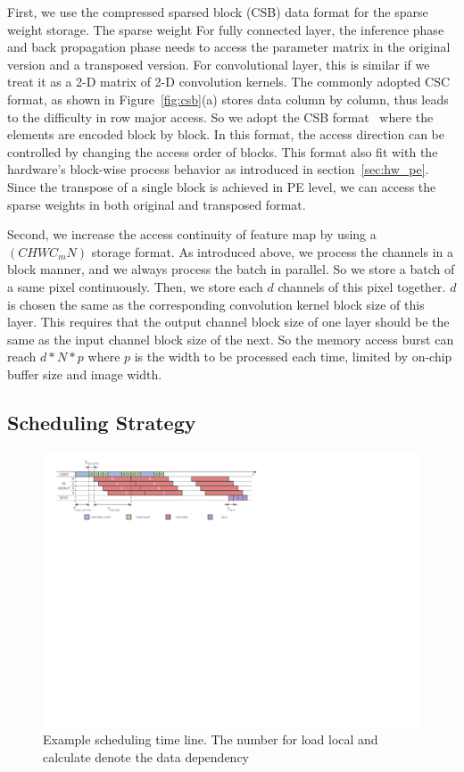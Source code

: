 First, we use the compressed sparsed block (CSB) data format for the sparse weight storage. The sparse weight For fully connected layer, the inference phase and back propagation phase needs to access the parameter matrix in the original version and a transposed version. For convolutional layer, this is similar if we treat it as a 2-D matrix of 2-D convolution kernels. The commonly adopted CSC format, as shown in Figure~\ref{fig:csb}(a) stores data column by column, thus leads to the difficulty in row major access. So we adopt the CSB format~\cite{bulucc2009parallel} where the elements are encoded block by block. In this format, the access direction can be controlled by changing the access order of blocks. This format also fit with the hardware's block-wise process behavior as introduced in section~\ref{sec:hw_pe}. Since the transpose of a single block is achieved in PE level, we can access the sparse weights in both original and transposed format.

Second, we increase the access continuity of feature map by using a $(CHWC_mN)$ storage format. As introduced above, we process the channels in a block manner, and we always process the batch in parallel. So we store a batch of a same pixel continuously. Then, we store each $d$ channels of this pixel together.  $d$ is chosen the same as the corresponding convolution kernel block size of this layer. This requires that the output channel block size of one layer should be the same as the input channel block size of the next. So the memory access burst can reach $d*N*p$ where $p$ is the width to be processed each time, limited by on-chip buffer size and image width. 

\subsection{Scheduling Strategy}

\begin{figure}[t]
  \centering
  \includegraphics[width=1.8\columnwidth]{figures/schedule.pdf}
  \caption{Example scheduling time line. The number for load local and calculate denote the data dependency}
  \label{fig:sch}
\end{figure}


